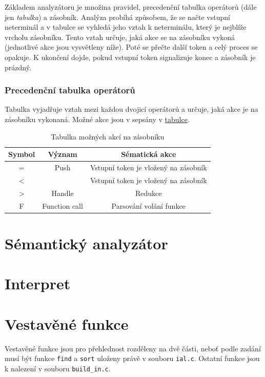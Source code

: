 \documentclass[a4paper,11pt]{article}
\begin{document}
Základem analyzátoru je množina pravidel, precedenční tabulka operátorů (dále jen \textit{tabulka}) a zásobník.
Analýza probíhá způsobem, že se načte vstupní neterminál a v tabulce se vyhledá jeho vztah k neterminálu, který je nejblíže vrcholu zásobníku. Tento vztah určuje, jaká akce se na zásobníku vykoná (jednotlivé akce jsou vysvětleny níže). Poté se přečte další token a celý proces se opakuje. K ukončení dojde, pokud vstupní token signalizuje konec a zásobník je prázdný.

\subsubsection{Precedenční tabulka operátorů}


Tabulka vyjadřuje vztah mezi každou dvojicí operátorů a určuje, jaká akce je na zásobníku vykonaná. Možné akce jsou v sepsány v \hyperref[tab:stackRules]{tabulce}.

\begin{table}[]
\centering
\label{tab:stackRules}
\begin{tabular}{@{}ccc@{}}
\toprule
Symbol       & Význam                            & Sématická akce                         \\ \midrule
=            & Push                              & Vstupní token je vložený na zásobník  \\
\textless    &                                   & Vstupní token je vložený na zásobník \\
\textgreater & Handle                            & Redukce                                \\
F            & Function call                     & Parsování volání funkce \\ \bottomrule
\end{tabular}
\caption{Tabulka možných akcí na zásobníku}
\end{table}

\section{Sémantický analyzátor}


\section{Interpret}

\section{Vestavěné funkce}
Vestavěné funkce jsou pro přehlednost rozděleny na dvě části, neboť podle zadání musí být funkce \texttt{find} a \texttt{sort} uloženy právě v souboru \texttt{ial.c}. Ostatní funkce jsou k nalezení v souboru \texttt{build\_in.c}.
\end{document}

